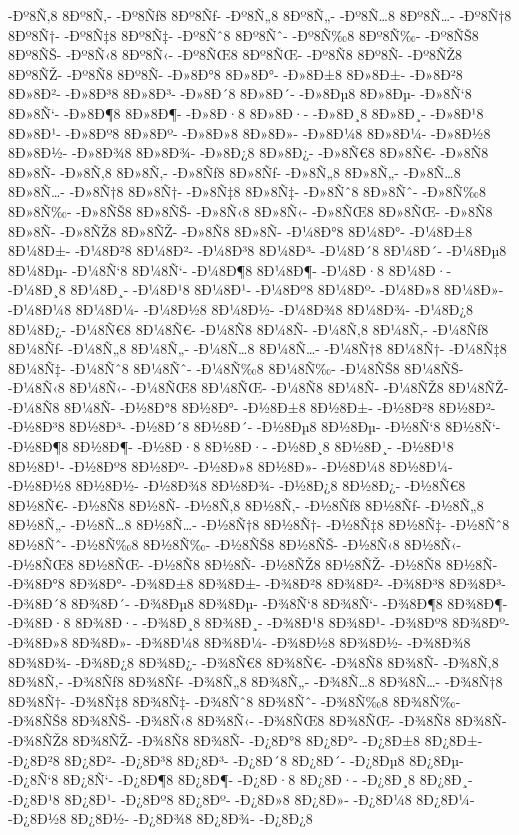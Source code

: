{-Ðº8Ñ‚8
8Ðº8Ñ‚-
-Ðº8Ñƒ8
8Ðº8Ñƒ-
-Ðº8Ñ„8
8Ðº8Ñ„-
-Ðº8Ñ…8
8Ðº8Ñ…-
-Ðº8Ñ†8
8Ðº8Ñ†-
-Ðº8Ñ‡8
8Ðº8Ñ‡-
-Ðº8Ñˆ8
8Ðº8Ñˆ-
-Ðº8Ñ‰8
8Ðº8Ñ‰-
-Ðº8ÑŠ8
8Ðº8ÑŠ-
-Ðº8Ñ‹8
8Ðº8Ñ‹-
-Ðº8ÑŒ8
8Ðº8ÑŒ-
-Ðº8Ñ8
8Ðº8Ñ-
-Ðº8ÑŽ8
8Ðº8ÑŽ-
-Ðº8Ñ8
8Ðº8Ñ-
-Ð»8Ð°8
8Ð»8Ð°-
-Ð»8Ð±8
8Ð»8Ð±-
-Ð»8Ð²8
8Ð»8Ð²-
-Ð»8Ð³8
8Ð»8Ð³-
-Ð»8Ð´8
8Ð»8Ð´-
-Ð»8Ðµ8
8Ð»8Ðµ-
-Ð»8Ñ‘8
8Ð»8Ñ‘-
-Ð»8Ð¶8
8Ð»8Ð¶-
-Ð»8Ð·8
8Ð»8Ð·-
-Ð»8Ð¸8
8Ð»8Ð¸-
-Ð»8Ð¹8
8Ð»8Ð¹-
-Ð»8Ðº8
8Ð»8Ðº-
-Ð»8Ð»8
8Ð»8Ð»-
-Ð»8Ð¼8
8Ð»8Ð¼-
-Ð»8Ð½8
8Ð»8Ð½-
-Ð»8Ð¾8
8Ð»8Ð¾-
-Ð»8Ð¿8
8Ð»8Ð¿-
-Ð»8Ñ€8
8Ð»8Ñ€-
-Ð»8Ñ8
8Ð»8Ñ-
-Ð»8Ñ‚8
8Ð»8Ñ‚-
-Ð»8Ñƒ8
8Ð»8Ñƒ-
-Ð»8Ñ„8
8Ð»8Ñ„-
-Ð»8Ñ…8
8Ð»8Ñ…-
-Ð»8Ñ†8
8Ð»8Ñ†-
-Ð»8Ñ‡8
8Ð»8Ñ‡-
-Ð»8Ñˆ8
8Ð»8Ñˆ-
-Ð»8Ñ‰8
8Ð»8Ñ‰-
-Ð»8ÑŠ8
8Ð»8ÑŠ-
-Ð»8Ñ‹8
8Ð»8Ñ‹-
-Ð»8ÑŒ8
8Ð»8ÑŒ-
-Ð»8Ñ8
8Ð»8Ñ-
-Ð»8ÑŽ8
8Ð»8ÑŽ-
-Ð»8Ñ8
8Ð»8Ñ-
-Ð¼8Ð°8
8Ð¼8Ð°-
-Ð¼8Ð±8
8Ð¼8Ð±-
-Ð¼8Ð²8
8Ð¼8Ð²-
-Ð¼8Ð³8
8Ð¼8Ð³-
-Ð¼8Ð´8
8Ð¼8Ð´-
-Ð¼8Ðµ8
8Ð¼8Ðµ-
-Ð¼8Ñ‘8
8Ð¼8Ñ‘-
-Ð¼8Ð¶8
8Ð¼8Ð¶-
-Ð¼8Ð·8
8Ð¼8Ð·-
-Ð¼8Ð¸8
8Ð¼8Ð¸-
-Ð¼8Ð¹8
8Ð¼8Ð¹-
-Ð¼8Ðº8
8Ð¼8Ðº-
-Ð¼8Ð»8
8Ð¼8Ð»-
-Ð¼8Ð¼8
8Ð¼8Ð¼-
-Ð¼8Ð½8
8Ð¼8Ð½-
-Ð¼8Ð¾8
8Ð¼8Ð¾-
-Ð¼8Ð¿8
8Ð¼8Ð¿-
-Ð¼8Ñ€8
8Ð¼8Ñ€-
-Ð¼8Ñ8
8Ð¼8Ñ-
-Ð¼8Ñ‚8
8Ð¼8Ñ‚-
-Ð¼8Ñƒ8
8Ð¼8Ñƒ-
-Ð¼8Ñ„8
8Ð¼8Ñ„-
-Ð¼8Ñ…8
8Ð¼8Ñ…-
-Ð¼8Ñ†8
8Ð¼8Ñ†-
-Ð¼8Ñ‡8
8Ð¼8Ñ‡-
-Ð¼8Ñˆ8
8Ð¼8Ñˆ-
-Ð¼8Ñ‰8
8Ð¼8Ñ‰-
-Ð¼8ÑŠ8
8Ð¼8ÑŠ-
-Ð¼8Ñ‹8
8Ð¼8Ñ‹-
-Ð¼8ÑŒ8
8Ð¼8ÑŒ-
-Ð¼8Ñ8
8Ð¼8Ñ-
-Ð¼8ÑŽ8
8Ð¼8ÑŽ-
-Ð¼8Ñ8
8Ð¼8Ñ-
-Ð½8Ð°8
8Ð½8Ð°-
-Ð½8Ð±8
8Ð½8Ð±-
-Ð½8Ð²8
8Ð½8Ð²-
-Ð½8Ð³8
8Ð½8Ð³-
-Ð½8Ð´8
8Ð½8Ð´-
-Ð½8Ðµ8
8Ð½8Ðµ-
-Ð½8Ñ‘8
8Ð½8Ñ‘-
-Ð½8Ð¶8
8Ð½8Ð¶-
-Ð½8Ð·8
8Ð½8Ð·-
-Ð½8Ð¸8
8Ð½8Ð¸-
-Ð½8Ð¹8
8Ð½8Ð¹-
-Ð½8Ðº8
8Ð½8Ðº-
-Ð½8Ð»8
8Ð½8Ð»-
-Ð½8Ð¼8
8Ð½8Ð¼-
-Ð½8Ð½8
8Ð½8Ð½-
-Ð½8Ð¾8
8Ð½8Ð¾-
-Ð½8Ð¿8
8Ð½8Ð¿-
-Ð½8Ñ€8
8Ð½8Ñ€-
-Ð½8Ñ8
8Ð½8Ñ-
-Ð½8Ñ‚8
8Ð½8Ñ‚-
-Ð½8Ñƒ8
8Ð½8Ñƒ-
-Ð½8Ñ„8
8Ð½8Ñ„-
-Ð½8Ñ…8
8Ð½8Ñ…-
-Ð½8Ñ†8
8Ð½8Ñ†-
-Ð½8Ñ‡8
8Ð½8Ñ‡-
-Ð½8Ñˆ8
8Ð½8Ñˆ-
-Ð½8Ñ‰8
8Ð½8Ñ‰-
-Ð½8ÑŠ8
8Ð½8ÑŠ-
-Ð½8Ñ‹8
8Ð½8Ñ‹-
-Ð½8ÑŒ8
8Ð½8ÑŒ-
-Ð½8Ñ8
8Ð½8Ñ-
-Ð½8ÑŽ8
8Ð½8ÑŽ-
-Ð½8Ñ8
8Ð½8Ñ-
-Ð¾8Ð°8
8Ð¾8Ð°-
-Ð¾8Ð±8
8Ð¾8Ð±-
-Ð¾8Ð²8
8Ð¾8Ð²-
-Ð¾8Ð³8
8Ð¾8Ð³-
-Ð¾8Ð´8
8Ð¾8Ð´-
-Ð¾8Ðµ8
8Ð¾8Ðµ-
-Ð¾8Ñ‘8
8Ð¾8Ñ‘-
-Ð¾8Ð¶8
8Ð¾8Ð¶-
-Ð¾8Ð·8
8Ð¾8Ð·-
-Ð¾8Ð¸8
8Ð¾8Ð¸-
-Ð¾8Ð¹8
8Ð¾8Ð¹-
-Ð¾8Ðº8
8Ð¾8Ðº-
-Ð¾8Ð»8
8Ð¾8Ð»-
-Ð¾8Ð¼8
8Ð¾8Ð¼-
-Ð¾8Ð½8
8Ð¾8Ð½-
-Ð¾8Ð¾8
8Ð¾8Ð¾-
-Ð¾8Ð¿8
8Ð¾8Ð¿-
-Ð¾8Ñ€8
8Ð¾8Ñ€-
-Ð¾8Ñ8
8Ð¾8Ñ-
-Ð¾8Ñ‚8
8Ð¾8Ñ‚-
-Ð¾8Ñƒ8
8Ð¾8Ñƒ-
-Ð¾8Ñ„8
8Ð¾8Ñ„-
-Ð¾8Ñ…8
8Ð¾8Ñ…-
-Ð¾8Ñ†8
8Ð¾8Ñ†-
-Ð¾8Ñ‡8
8Ð¾8Ñ‡-
-Ð¾8Ñˆ8
8Ð¾8Ñˆ-
-Ð¾8Ñ‰8
8Ð¾8Ñ‰-
-Ð¾8ÑŠ8
8Ð¾8ÑŠ-
-Ð¾8Ñ‹8
8Ð¾8Ñ‹-
-Ð¾8ÑŒ8
8Ð¾8ÑŒ-
-Ð¾8Ñ8
8Ð¾8Ñ-
-Ð¾8ÑŽ8
8Ð¾8ÑŽ-
-Ð¾8Ñ8
8Ð¾8Ñ-
-Ð¿8Ð°8
8Ð¿8Ð°-
-Ð¿8Ð±8
8Ð¿8Ð±-
-Ð¿8Ð²8
8Ð¿8Ð²-
-Ð¿8Ð³8
8Ð¿8Ð³-
-Ð¿8Ð´8
8Ð¿8Ð´-
-Ð¿8Ðµ8
8Ð¿8Ðµ-
-Ð¿8Ñ‘8
8Ð¿8Ñ‘-
-Ð¿8Ð¶8
8Ð¿8Ð¶-
-Ð¿8Ð·8
8Ð¿8Ð·-
-Ð¿8Ð¸8
8Ð¿8Ð¸-
-Ð¿8Ð¹8
8Ð¿8Ð¹-
-Ð¿8Ðº8
8Ð¿8Ðº-
-Ð¿8Ð»8
8Ð¿8Ð»-
-Ð¿8Ð¼8
8Ð¿8Ð¼-
-Ð¿8Ð½8
8Ð¿8Ð½-
-Ð¿8Ð¾8
8Ð¿8Ð¾-
-Ð¿8Ð¿8
}
